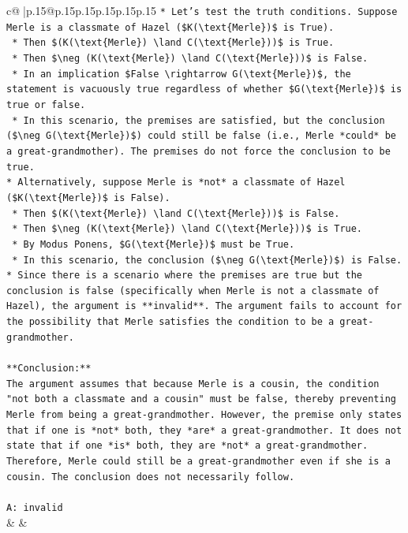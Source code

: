\documentclass{article}
\begin{document}
{\begin{supertabular}{c@{$\;$}|p{.15\linewidth}@{}p{.15\linewidth}p{.15\linewidth}p{.15\linewidth}p{.15\linewidth}p{.15\linewidth}}
{{{\texttt{*   Let's test the truth conditions. Suppose Merle is a classmate of Hazel (\$K(\textbackslash{}text\{Merle\})\$ is True).} \\
\texttt{    *   Then \$(K(\textbackslash{}text\{Merle\}) \textbackslash{}land C(\textbackslash{}text\{Merle\}))\$ is True.} \\
\texttt{    *   Then \$\textbackslash{}neg (K(\textbackslash{}text\{Merle\}) \textbackslash{}land C(\textbackslash{}text\{Merle\}))\$ is False.} \\
\texttt{    *   In an implication \$False \textbackslash{}rightarrow G(\textbackslash{}text\{Merle\})\$, the statement is vacuously true regardless of whether \$G(\textbackslash{}text\{Merle\})\$ is true or false.} \\
\texttt{    *   In this scenario, the premises are satisfied, but the conclusion (\$\textbackslash{}neg G(\textbackslash{}text\{Merle\})\$) could still be false (i.e., Merle *could* be a great{-}grandmother). The premises do not force the conclusion to be true.} \\
\texttt{*   Alternatively, suppose Merle is *not* a classmate of Hazel (\$K(\textbackslash{}text\{Merle\})\$ is False).} \\
\texttt{    *   Then \$(K(\textbackslash{}text\{Merle\}) \textbackslash{}land C(\textbackslash{}text\{Merle\}))\$ is False.} \\
\texttt{    *   Then \$\textbackslash{}neg (K(\textbackslash{}text\{Merle\}) \textbackslash{}land C(\textbackslash{}text\{Merle\}))\$ is True.} \\
\texttt{    *   By Modus Ponens, \$G(\textbackslash{}text\{Merle\})\$ must be True.} \\
\texttt{    *   In this scenario, the conclusion (\$\textbackslash{}neg G(\textbackslash{}text\{Merle\})\$) is False.} \\
\texttt{*   Since there is a scenario where the premises are true but the conclusion is false (specifically when Merle is not a classmate of Hazel), the argument is **invalid**. The argument fails to account for the possibility that Merle satisfies the condition to be a great{-}grandmother.} \\
\\ 
\texttt{**Conclusion:**} \\
\texttt{The argument assumes that because Merle is a cousin, the condition "not both a classmate and a cousin" must be false, thereby preventing Merle from being a great{-}grandmother. However, the premise only states that if one is *not* both, they *are* a great{-}grandmother. It does not state that if one *is* both, they are *not* a great{-}grandmother. Therefore, Merle could still be a great{-}grandmother even if she is a cousin. The conclusion does not necessarily follow.} \\
\\ 
\texttt{A: invalid} \\
            }
        }
    }
    & & \\ \\


\end{supertabular}}
\end{document}
